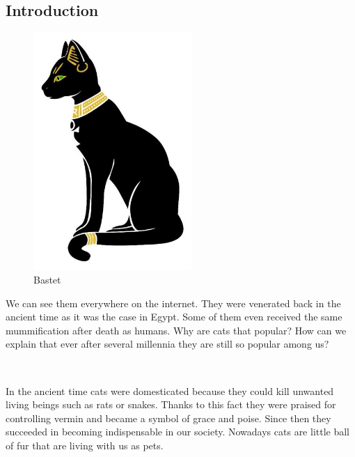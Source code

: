 \documentclass[a0,portrait,20pt]{a0poster}
\begin{document}
\begin{multicols}{2} %


\color{SaddleBrown} %

\section*{Introduction}

\begin{figure}\includegraphics[width=6cm]{bastet.png}\caption{Bastet}\end{figure}
\large We can see them everywhere on the internet. They were venerated back in the ancient time as it was the case in Egypt. Some of them even received the same mummification after death as humans. Why are cats that popular? How can we explain that ever after several millennia they are still so popular among us?

~

In the ancient time cats were domesticated because they could kill unwanted living beings such as rats or snakes. Thanks to this fact they were praised for controlling vermin and became a symbol of grace and poise. Since then they succeeded in becoming indispensable in our society. Nowadays cats are little ball of fur that are living with us as pets.




\end{multicols}
\end{document}
